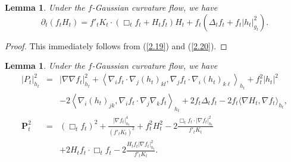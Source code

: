 \documentclass{amsart}
\newtheorem{lemma}[theorem]{Lemma}
\theoremstyle{definition}
\theoremstyle{remark}
\numberwithin{equation}{section}
\begin{document}
\begin{lemma} \label{l3.3}Under the $f$-Gaussian curvature flow, we have
\begin{equation}
\partial_{t}(f_{t}H_{t})=f'_{t}K_{t}\cdot(\Box_{t} f_{t}+H_{t}f_{t})H_{t}
+f_{t}(\Delta_{t} f_{t}+f_{t}|h_{t}|^{2}_{g_{t}}).\label{3.8}
\end{equation}
\end{lemma}

\begin{proof} This immediately follows from (\ref{2.19}) and (\ref{2.20}).
\end{proof}

\begin{lemma} \label{l3.4} Under the $f$-Gaussian curvature flow, we have
\begin{eqnarray}
|P_{t}|^{2}_{h_{t}}&=&|\nabla\nabla f_{t}|^{2}_{h_{t}}+\left\langle\nabla_{i}f_{t}\cdot\nabla_{j}(h_{t})_{kl},
\nabla_{j}f_{t}\cdot\nabla_{i}(h_{t})_{k\ell}\right\rangle_{h_{t}}\nonumber
+f^{2}_{t}|h_{t}|^{2}\\
&&-2\left\langle\nabla_{i}(h_{t})_{jk},\nabla_{i}f_{t}
\cdot\nabla_{j}
\nabla_{k}f_{t}\right\rangle_{h_{t}}+2f_{t}\Delta_{t} f_{t}-2f_{t}
\langle\nabla H_{t},\nabla f_{t}\rangle_{h_{t}},\label{3.9}\\
\mathbf{P}^{2}_{t}&=&\left(\Box_{t} f_{t}\right)^{2}+\frac{|\nabla f_{t}|^{4}_{h_{t}}}{(f'_{t}K_{t})^{2}}
+f^{2}_{t}H^{2}_{t}-2\frac{\Box_{t} f_{t}\cdot|\nabla f_{t}|^{2}_{h_{t}}}{f'_{t}K_{t}}\nonumber\\
&&+2H_{t}f_{t}\cdot\Box_{t} f_{t}-2\frac{H_{t}f_{t}|\nabla f_{t}|^{2}_{h_{t}}}{f'_{t}K_{t}}.\label{3.10}
\end{eqnarray}
\end{lemma}
\end{document}
